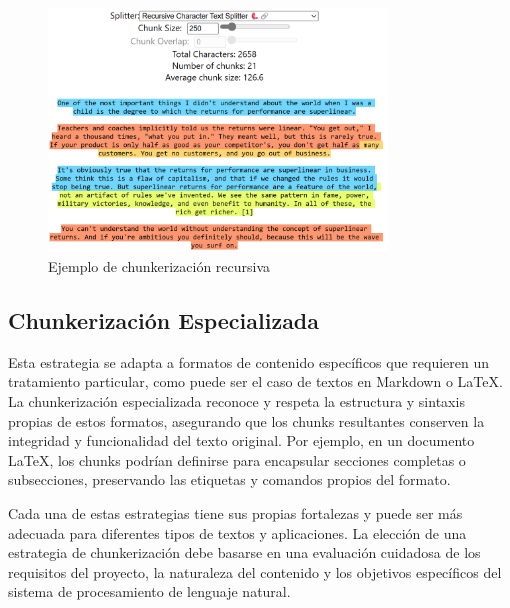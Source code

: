 \begin{figure}[!h]
\centering
\includegraphics[width=0.8\textwidth]{figuras/capitulo4/recursive_character_splitter_250_0.png}
\caption{Ejemplo de chunkerización recursiva}
\label{fig:imagen_recursiva}
\end{figure}

\subsection{Chunkerización Especializada}

Esta estrategia se adapta a formatos de contenido específicos que requieren un tratamiento particular, como puede ser el caso de textos en Markdown o LaTeX. La chunkerización especializada reconoce y respeta la estructura y sintaxis propias de estos formatos, asegurando que los chunks resultantes conserven la integridad y funcionalidad del texto original. Por ejemplo, en un documento LaTeX, los chunks podrían definirse para encapsular secciones completas o subsecciones, preservando las etiquetas y comandos propios del formato.

Cada una de estas estrategias tiene sus propias fortalezas y puede ser más adecuada para diferentes tipos de textos y aplicaciones. La elección de una estrategia de chunkerización debe basarse en una evaluación cuidadosa de los requisitos del proyecto, la naturaleza del contenido y los objetivos específicos del sistema de procesamiento de lenguaje natural.

